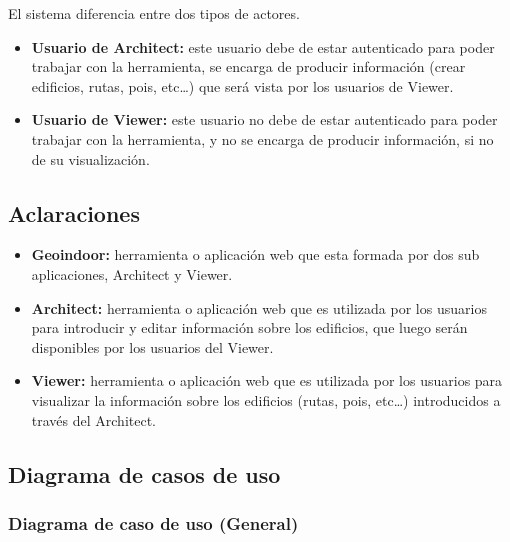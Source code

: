 El sistema diferencia entre dos tipos de actores.

\begin{itemize}
	\item
	\textbf{Usuario de Architect:} este usuario debe de estar autenticado para poder trabajar con la herramienta, se encarga de producir información (crear edificios, rutas, pois, etc\ldots) que será vista por los usuarios de Viewer.
	\item
	\textbf{Usuario de Viewer:} este usuario no debe de estar autenticado para poder trabajar con la herramienta, y no se encarga de producir información, si no de su visualización.
\end{itemize}

\subsection{Aclaraciones}

\begin{itemize}
	\item
	\textbf{Geoindoor:} herramienta o aplicación web que esta formada por dos sub aplicaciones, Architect y Viewer.
	\item
	\textbf{Architect:} herramienta o aplicación web que es utilizada por los usuarios para introducir y editar información sobre los edificios, que luego serán disponibles por los usuarios del Viewer.
	\item
	\textbf{Viewer:} herramienta o aplicación web que es utilizada por los usuarios para visualizar la información sobre los edificios (rutas, pois, etc\ldots) introducidos a través del Architect.
\end{itemize}

\newpage
\subsection{Diagrama de casos de uso}

\newpage
{}
\newpage
{}
\newpage
{}
\newpage
{}

\newpage
\subsubsection{Diagrama de caso de uso (General)}

